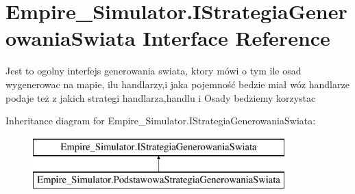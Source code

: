\hypertarget{interface_empire___simulator_1_1_i_strategia_generowania_swiata}{\section{Empire\+\_\+\+Simulator.\+I\+Strategia\+Generowania\+Swiata Interface Reference}
\label{interface_empire___simulator_1_1_i_strategia_generowania_swiata}
}


Jest to ogolny interfejs generowania swiata, ktory mówi o tym ile osad wygenerowac na mapie, ilu handlarzy,i jaka pojemność bedzie miał wóz handlarze podaje też z jakich strategi handlarza,handlu i Osady bedziemy korzystac  


Inheritance diagram for Empire\+\_\+\+Simulator.\+I\+Strategia\+Generowania\+Swiata\+:\begin{figure}[H]
\begin{center}
\leavevmode
\includegraphics[height=2.000000cm]{interface_empire___simulator_1_1_i_strategia_generowania_swiata}
\end{center}
\end{figure}
